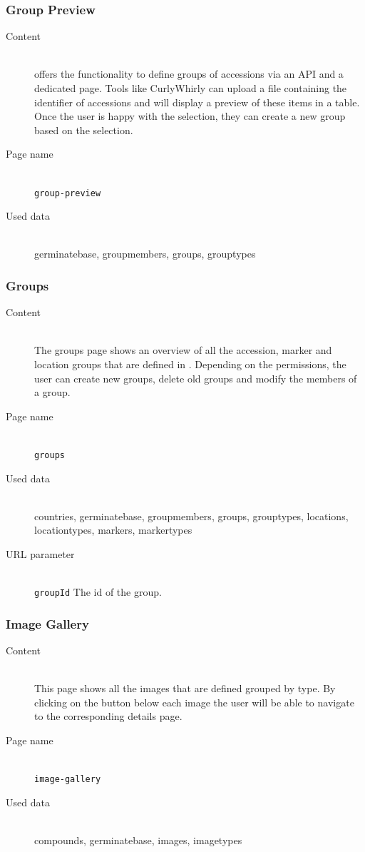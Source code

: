 \subsubsection{Group Preview}
\begin{description}
	\item[Content]\hfill\\ {\germinate} offers the functionality to define groups of accessions via an API and a dedicated page. Tools like CurlyWhirly can upload a file containing the identifier of accessions and {\germinate} will display a preview of these items in a table. Once the user is happy with the selection, they can create a new group based on the selection.
	\item[Page name]\hfill\\\texttt{group-preview}
	\item[Used data]\hfill\\germinatebase, groupmembers, groups, grouptypes
\end{description}

\subsubsection{Groups}
\begin{description}
	\item[Content]\hfill\\The groups page shows an overview of all the accession, marker and location groups that are defined in {\germinate}. Depending on the permissions, the user can create new groups, delete old groups and modify the members of a group.
	\item[Page name]\hfill\\\texttt{groups}
	\item[Used data]\hfill\\countries, germinatebase, groupmembers, groups, grouptypes, locations, locationtypes, markers, markertypes
	\item[URL parameter]\hfill\\\texttt{groupId} The id of the group.
\end{description}

\subsubsection{Image Gallery}
\begin{description}
	\item[Content]\hfill\\This page shows all the images that are defined grouped by type. By clicking on the button below each image the user will be able to navigate to the corresponding details page.
	\item[Page name]\hfil\\\texttt{image-gallery}
	\item[Used data]\hfill\\compounds, germinatebase, images, imagetypes
\end{description}

